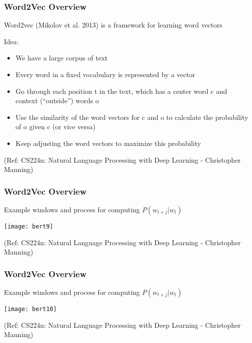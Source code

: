 \begin{frame}[fragile]\frametitle{Word2Vec Overview}
Word2vec (Mikolov et al. 2013) is a framework for learning  word vectors

Idea:
\begin{itemize}
\item We have a large corpus of text
\item Every word in a fixed vocabulary is represented by a vector
\item Go through each position t in the text, which has a center word
c and context (“outside”) words o
\item Use the similarity of the word vectors for c and o to calculate  the probability of o given c (or vice versa)
\item Keep adjusting the word vectors to maximize this probability

\end{itemize}

{\tiny (Ref: CS224n: Natural Language Processing with Deep Learning - Christopher Manning)}

\end{frame}

\begin{frame}[fragile]\frametitle{Word2Vec Overview}
Example windows and process for computing  $P(w_{t+j}|w_t)$


\begin{center}
\texttt{[image: bert9]}
\end{center}	

{\tiny (Ref: CS224n: Natural Language Processing with Deep Learning - Christopher Manning)}

\end{frame}

\begin{frame}[fragile]\frametitle{Word2Vec Overview}
Example windows and process for computing  $P(w_{t+j}|w_t)$


\begin{center}
\texttt{[image: bert10]}
\end{center}	

{\tiny (Ref: CS224n: Natural Language Processing with Deep Learning - Christopher Manning)}

\end{frame}


